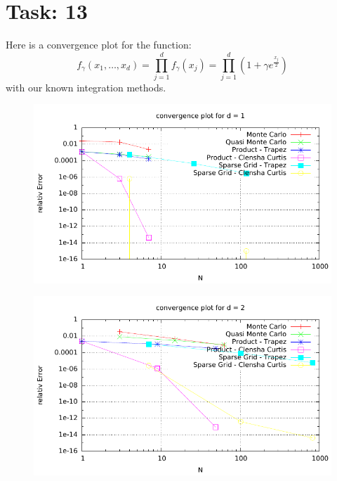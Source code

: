 \documentclass{article}
\begin{document}
\section*{Task: 13}
Here is a convergence plot for the function: 
\[ f_{\gamma}(x_1, \dots , x_d) = \prod_{j=1}^{d} f_{\gamma}(x_j) =  \prod_{j=1}^{d} \left(1 + \gamma e^{\frac{x_j}{2}}\right) \]
with our known integration methods.
\begin{figure}[htbp]
  \centering
     \includegraphics[width=1.0\textwidth]{../Task13/sh3_task13_convergencePlotd1.pdf}
\end{figure}
\newpage
\begin{figure}[htbp]
  \centering
     \includegraphics[width=1.0\textwidth]{../Task13/sh3_task13_convergencePlotd2.pdf}
\end{figure}
\end{document}
